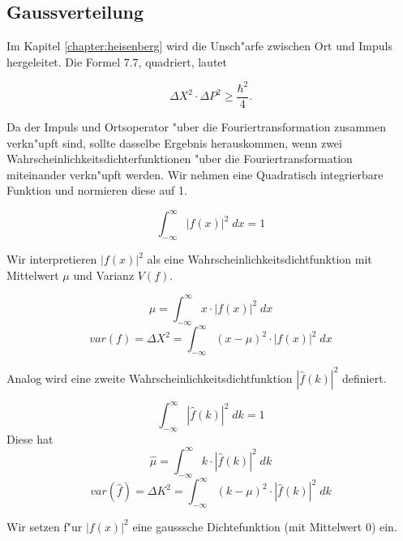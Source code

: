 \begin{refsection}
\subsection{Gaussverteilung}

Im Kapitel \ref{chapter:heisenberg} wird die Unsch"arfe zwischen Ort und Impuls hergeleitet. Die Formel 7.7, quadriert, lautet  

\begin{equation}
\varDelta X^{2}\cdot\varDelta P^{2}\ge \frac{\hbar^{2}}4.
\end{equation}

Da der Impuls und Ortsoperator "uber die Fouriertransformation zusammen verkn"upft sind, sollte dasselbe Ergebnis herauskommen, wenn zwei Wahrscheinlichkeitsdichterfunktionen "uber die Fouriertransformation miteinander verkn"upft werden. Wir nehmen eine Quadratisch integrierbare Funktion und normieren diese auf 1.

\begin{equation}
	\int_{-\infty}^{\infty} |f(x)|^{2} \; dx = 1
\end{equation}

Wir interpretieren $|f(x)|^{2}$ als eine Wahrscheinlichkeitsdichtfunktion mit Mittelwert $\mu$ und Varianz $V(f)$.

\begin{equation}
	\mu = \int_{-\infty}^{\infty} x \cdot |f(x)|^{2} \; dx
\end{equation}
\begin{equation}	
	var(f) = \varDelta X^{2} = \int_{-\infty}^{\infty} (x-\mu)^{2} \cdot |f(x)|^{2} \; dx
	\label{equation:varianz1}
\end{equation}

Analog wird eine zweite Wahrscheinlichkeitsdichtfunktion $|\hat{f}(k)|^{2}$ definiert.

\begin{equation}
	\int_{-\infty}^{\infty}  |\hat{f}(k)|^{2} \; dk = 1
\end{equation}
Diese hat 
\begin{equation}
	\hat{\mu} = \int_{-\infty}^{\infty} k \cdot  |\hat{f}(k)|^{2}\; dk
\end{equation}
\begin{equation}	
	var(\hat{f}) = \varDelta K^{2}  = \int_{-\infty}^{\infty} (k-\mu)^{2} \cdot  |\hat{f}(k)|^{2} \; dk
	\label{equation:varianz2}
\end{equation}

Wir setzen f"ur $|f(x)|^{2}$ eine gausssche Dichtefunktion (mit Mittelwert 0) ein.


\end{refsection}
